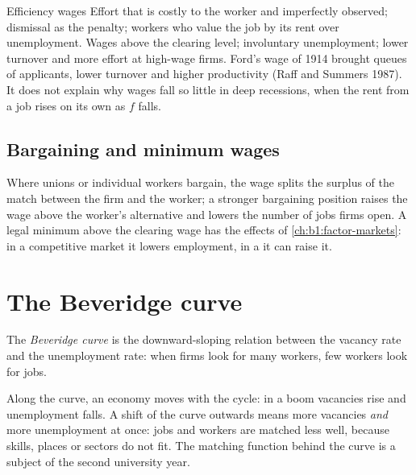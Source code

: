 \begin{model}{Efficiency wages}
\assumes Effort that is costly to the worker and imperfectly observed;
dismissal as the penalty; workers who value the job by its rent over
unemployment.
\predicts Wages above the clearing level; involuntary unemployment; lower
turnover and more effort at high-wage firms.
\tested Ford's wage of 1914 brought queues of applicants, lower turnover
and higher productivity (Raff and Summers 1987). %
\breaks It does not explain why wages fall so little in deep recessions,
when the rent from a job rises on its own as $f$ falls.
\end{model}

\subsection*{Bargaining and minimum wages}

Where unions or individual workers bargain, the wage splits the surplus of
the match between the firm and the worker; a stronger bargaining position
raises the wage above the worker's alternative and lowers the number of
jobs firms open. A legal minimum above the clearing wage has the effects of
\cref{ch:b1:factor-markets}: in a competitive market it lowers employment,
in a  it can raise it.

\section{The Beveridge curve}\label{sec:b1:unemployment-flows:beveridge}

\begin{definition}\label{def:b1:unemployment-flows:beveridge}
The \emph{Beveridge curve} is the downward-sloping relation between the
vacancy rate and the unemployment rate: when firms look for many workers,
few workers look for jobs.
\end{definition}

Along the curve, an economy moves with the cycle: in a boom vacancies rise
and unemployment falls. A shift of the curve outwards means more vacancies
\emph{and} more unemployment at once: jobs and workers are matched less
well, because skills, places or sectors do not fit. The matching function
behind the curve is a subject of the second university year.

